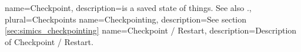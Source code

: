 
\newcommand{\dvttermapi}{\dvtcmdabbrev{dvtglossapi}}
\newcommand{\dvttermabi}{\dvtcmdabbrev{dvtglossabi}}
\newcommand{\dvttermandroid}{Android}
\newcommand{\dvttermandroidsdk}{\dvttermandroid\ SDK}
\newcommand{\dvttermandroidemulator}{\dvttermandroid\ emulator}
\newcommand{\dvttermacm}{ACM}
\newcommand{\dvttermarm}{ARM}


{
  name=Checkpoint,
  description={is a saved state of things. See also \dvttermcheckpointing .},
  plural=Checkpoints
}
\newcommand{\dvttermcheckpoint}{\dvtcmdcaponce{Checkpoint}}
{
  name=Checkpointing,
  description={See section \ref{sec:simics_checkpointing}}
}
\newcommand{\dvttermcheckpointing}{\dvtcmdcaponcegloss{dvtglosscheckpointing}{Checkpointing}}
\newcommand{\dvttermcpu}{\glslink{dvtglosscpu}{CPU}} %
{
  name=Checkpoint / Restart,
  description={Description of Checkpoint / Restart.}
}
\newcommand{\dvttermcheckpointrestart}{\dvtcmdcaponcegloss{dvtglosscheckpointrestart}{Checkpoint / Restart}}
\newcommand{\dvttermcuda}{CUDA}
\newcommand{\dvttermc}{\texttt{C}}
\newcommand{\dvttermcplusplus}{\texttt{C++}}
\newcommand{\dvttermcisco}{Cisco Systems, Inc.}


